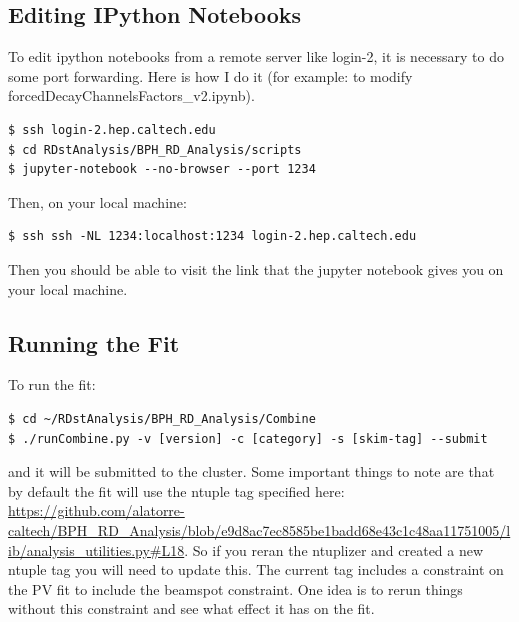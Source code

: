\documentclass[12pt]{report}
\begin{document}
\subsection{Editing IPython Notebooks}
To edit ipython notebooks from a remote server like login-2, it is necessary to do some port forwarding. Here is how I do it (for example: to modify forcedDecayChannelsFactors\_v2.ipynb).
\begin{mdframed}[backgroundcolor=light-gray, roundcorner=10pt,leftmargin=1, rightmargin=1, innerleftmargin=15, innertopmargin=15,innerbottommargin=15, outerlinewidth=1, linecolor=light-gray,roundcorner=20pt]
\begin{lstlisting}
$ ssh login-2.hep.caltech.edu
$ cd RDstAnalysis/BPH_RD_Analysis/scripts
$ jupyter-notebook --no-browser --port 1234
\end{lstlisting}
\end{mdframed}
Then, on your local machine:
\begin{mdframed}[backgroundcolor=light-gray, roundcorner=10pt,leftmargin=1, rightmargin=1, innerleftmargin=15, innertopmargin=15,innerbottommargin=15, outerlinewidth=1, linecolor=light-gray,roundcorner=20pt]
\begin{lstlisting}
$ ssh ssh -NL 1234:localhost:1234 login-2.hep.caltech.edu
\end{lstlisting}
\end{mdframed}
Then you should be able to visit the link that the jupyter notebook gives you
on your local machine.
\subsection{Running the Fit}
To run the fit:
\begin{mdframed}[backgroundcolor=light-gray, roundcorner=10pt,leftmargin=1, rightmargin=1, innerleftmargin=15, innertopmargin=15,innerbottommargin=15, outerlinewidth=1, linecolor=light-gray,roundcorner=20pt]
\begin{lstlisting}
$ cd ~/RDstAnalysis/BPH_RD_Analysis/Combine
$ ./runCombine.py -v [version] -c [category] -s [skim-tag] --submit
\end{lstlisting}
\end{mdframed}
and it will be submitted to the cluster. Some important things to note are that
by default the fit will use the ntuple tag specified here:
\url{https://github.com/alatorre-caltech/BPH_RD_Analysis/blob/e9d8ac7ec8585be1badd68e43c1c48aa11751005/lib/analysis_utilities.py#L18}.
So if you reran the ntuplizer and created a new ntuple tag you will need to
update this. The current tag includes a constraint on the PV fit to include the
beamspot constraint. One idea is to rerun things without this constraint and
see what effect it has on the fit.
\end{document}
